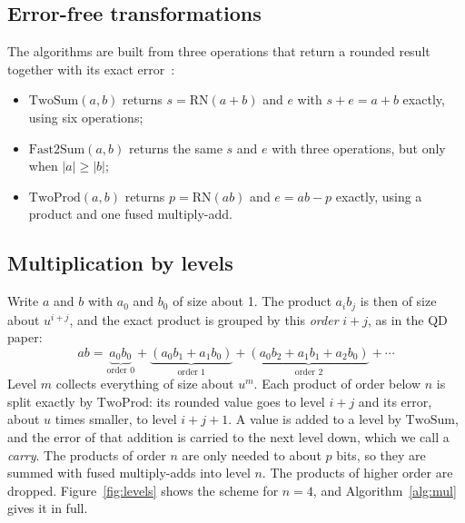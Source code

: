 \documentclass[conference]{IEEEtran}
\theoremstyle{definition}
\theoremstyle{remark}
\newcommand{\RN}{\mathrm{RN}}
\newcommand{\TwoSum}{\mathrm{TwoSum}}
\newcommand{\FastTwoSum}{\mathrm{Fast2Sum}}
\newcommand{\TwoProd}{\mathrm{TwoProd}}
\begin{document}
\subsection{Error-free transformations}

\begin{samepage}
The algorithms are built from three operations that return a rounded result together with its exact
error~\cite{Moller65,Knuth97,Dekker71,ORO05}:
\begin{itemize}
\item $\TwoSum(a, b)$ returns $s = \RN(a + b)$ and $e$ with $s + e = a + b$ exactly, using six operations;
\item $\FastTwoSum(a, b)$ returns the same $s$ and $e$ with three operations, but only when $|a| \ge |b|$;
\item $\TwoProd(a, b)$ returns $p = \RN(ab)$ and $e = ab - p$ exactly, using a product and one fused multiply-add.
\end{itemize}
\end{samepage}

\subsection{Multiplication by levels}

Write $a$ and $b$ with $a_0$ and $b_0$ of size about 1. The product $a_ib_j$ is then of size about $u^{i+j}$, and the
exact product is grouped by this \emph{order} $i + j$, as in the QD paper:
\[
ab = \underbrace{a_0b_0}_{\text{order } 0} + \underbrace{(a_0b_1 + a_1b_0)}_{\text{order } 1} +
\underbrace{(a_0b_2 + a_1b_1 + a_2b_0)}_{\text{order } 2} + \cdots
\]
Level $m$ collects everything of size about $u^m$. Each product of order below $n$ is split exactly by $\TwoProd$: its
rounded value goes to level $i + j$ and its error, about $u$ times smaller, to level $i + j + 1$. A value is added to a
level by $\TwoSum$, and the error of that addition is carried to the next level down, which we call a \emph{carry}. The
products of order $n$ are only needed to about $p$ bits, so they are summed with fused multiply-adds into level $n$.
The products of higher order are dropped. Figure~\ref{fig:levels} shows the scheme for $n = 4$, and
Algorithm~\ref{alg:mul} gives it in full.
\end{document}

